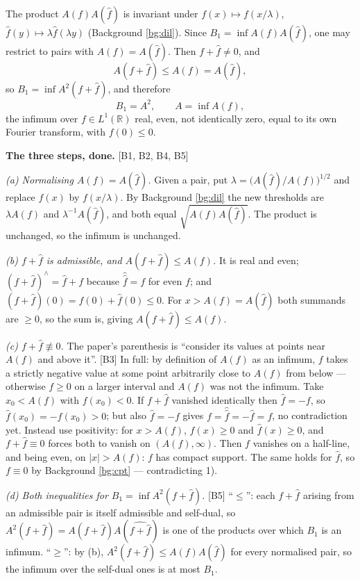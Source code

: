 \documentclass[11pt,reqno]{amsart}
\theoremstyle{plain}
\theoremstyle{definition}
\theoremstyle{remark}
\newcommand{\R}{\mathbb{R}}
\newcommand{\fh}{\widehat{f}}
\newcommand{\Ledger}[1]{{\scriptsize\textsf{[#1]}}}
\begin{document}
The product $A(f)A(\fh)$ is invariant under $f(x)\mapsto f(x/\lambda)$,
$\fh(y)\mapsto\lambda\fh(\lambda y)$ (Background \ref{bg:dil}). Since
$B_1=\inf A(f)A(\fh)$, one may restrict to pairs with $A(f)=A(\fh)$. Then
$f+\fh\ne0$, and
\[A(f+\fh)\le A(f)=A(\fh),\]
so $B_1=\inf A^2(f+\fh)$, and therefore
\begin{equation}\label{eq:BA}
 B_1=A^2,\qquad A=\inf A(f),
\end{equation}
the infimum over $f\in L^1(\R)$ real, even, not identically zero, equal to its own
Fourier transform, with $f(0)\le0$.

\begin{expansion}
\textbf{The three steps, done.} \Ledger{B1, B2, B4, B5}

\emph{(a) Normalising $A(f)=A(\fh)$.} Given a pair, put
$\lambda=\bigl(A(\fh)/A(f)\bigr)^{1/2}$ and replace $f(x)$ by $f(x/\lambda)$. By
Background \ref{bg:dil} the new thresholds are $\lambda A(f)$ and
$\lambda^{-1}A(\fh)$, and both equal $\sqrt{A(f)A(\fh)}$. The product is unchanged,
so the infimum is unchanged.

\emph{(b) $f+\fh$ is admissible, and $A(f+\fh)\le A(f)$.} It is real and even;
$(f+\fh)^{\wedge}=\fh+f$ because $\widehat{\fh}=f$ for even $f$; and
$(f+\fh)(0)=f(0)+\fh(0)\le0$. For $x>A(f)=A(\fh)$ both summands are $\ge0$, so the
sum is, giving $A(f+\fh)\le A(f)$.

\emph{(c) $f+\fh\not\equiv0$.} The paper's parenthesis is ``consider its values at
points near $A(f)$ and above it''. \Ledger{B3} In full: by definition of $A(f)$ as an
infimum, $f$ takes a strictly negative value at some point arbitrarily close to
$A(f)$ from below --- otherwise $f\ge0$ on a larger interval and $A(f)$ was not the
infimum. Take $x_0<A(f)$ with $f(x_0)<0$. If $f+\fh$ vanished identically then
$\fh=-f$, so $\fh(x_0)=-f(x_0)>0$; but also $\fh=-f$ gives
$f=\widehat{\fh}=-\fh=f$, no contradiction yet. Instead use positivity: for
$x>A(f)$, $f(x)\ge0$ and $\fh(x)\ge0$, and $f+\fh\equiv0$ forces both to vanish on
$(A(f),\infty)$. Then $f$ vanishes on a half-line, and being even, on $|x|>A(f)$:
$f$ has compact support. The same holds for $\fh$, so $f\equiv0$ by Background
\ref{bg:cpt} --- contradicting 1).

\emph{(d) Both inequalities for $B_1=\inf A^2(f+\fh)$.} \Ledger{B5} ``$\le$'': each
$f+\fh$ arising from an admissible pair is itself admissible and self-dual, so
$A^2(f+\fh)=A(f+\fh)A(\widehat{f+\fh})$ is one of the products over which $B_1$ is an
infimum. ``$\ge$'': by (b), $A^2(f+\fh)\le A(f)A(\fh)$ for every normalised pair, so
the infimum over the self-dual ones is at most $B_1$.
\end{expansion}
\end{document}
